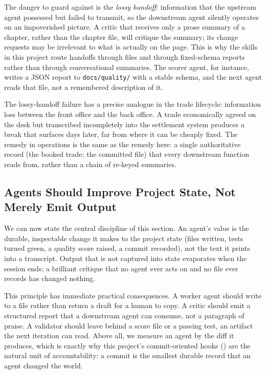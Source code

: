 The danger to guard against is the \emph{lossy handoff}: information that the upstream agent possessed but failed to transmit, so the downstream agent silently operates on an impoverished picture. A critic that receives only a prose summary of a chapter, rather than the chapter file, will critique the summary; its change requests may be irrelevant to what is actually on the page. This is why the skills in this project route handoffs through files and through fixed-schema reports rather than through conversational summaries. The scorer agent, for instance, writes a JSON report to \texttt{docs/quality/} with a stable schema, and the next agent reads that file, not a remembered description of it.

\begin{context}
The lossy-handoff failure has a precise analogue in the trade lifecycle: information loss between the front office and the back office. A trade economically agreed on the desk but transcribed incompletely into the settlement system produces a break that surfaces days later, far from where it can be cheaply fixed. The remedy in operations is the same as the remedy here: a single authoritative record (the booked trade; the committed file) that every downstream function reads from, rather than a chain of re-keyed summaries.
\end{context}

\subsection{Agents Should Improve Project State, Not Merely Emit Output}\label{subsec:agents-improve-state}

We can now state the central discipline of this section. An agent's value is the durable, inspectable change it makes to the project state (files written, tests turned green, a quality score raised, a commit recorded), not the text it prints into a transcript. Output that is not captured into state evaporates when the session ends; a brilliant critique that no agent ever acts on and no file ever records has changed nothing.

This principle has immediate practical consequences. A worker agent should write to a file rather than return a draft for a human to copy. A critic should emit a structured report that a downstream agent can consume, not a paragraph of praise. A validator should leave behind a score file or a passing test, an artifact the next iteration can read. Above all, we measure an agent by the diff it produces, which is exactly why this project's commit-oriented hooks () are the natural unit of accountability: a commit is the smallest durable record that an agent changed the world.

